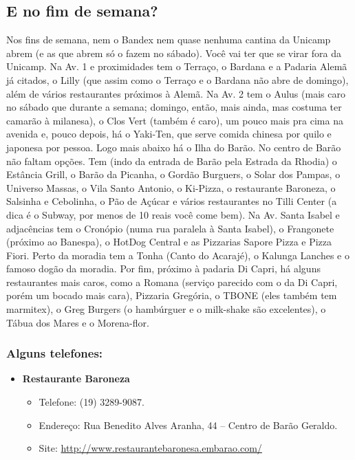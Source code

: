 \subsection{E no fim de semana?}
Nos fins de semana, nem o Bandex nem quase nenhuma cantina da Unicamp abrem (e
as que abrem só o fazem no sábado). Você vai ter que se virar fora da Unicamp.
Na Av. 1 e proximidades tem o Terraço, o Bardana e a Padaria Alemã já citados,
o Lilly (que assim como o Terraço e o Bardana não abre de domingo), além de
vários restaurantes próximos à Alemã. Na Av. 2 tem o Aulus (mais caro no sábado
que durante a semana; domingo, então, mais ainda, mas costuma ter camarão
à milanesa), o Clos Vert (também é caro), um pouco mais pra cima na avenida e,
pouco depois, há o Yaki-Ten, que serve comida chinesa por quilo e japonesa por
pessoa. Logo mais abaixo há o Ilha do Barão. No centro de Barão não faltam
opções. Tem (indo da entrada de Barão pela Estrada da Rhodia) o Estância Grill,
o Barão da Picanha, o Gordão Burguers, o Solar dos Pampas, o Universo Massas,
o Vila Santo Antonio, o Ki-Pizza, o restaurante Baroneza, o Salsinha
e Cebolinha, o Pão de Açúcar e vários restaurantes no Tilli Center (a dica
é o Subway, por menos de 10 reais você come bem). Na Av. Santa Isabel
e adjacências tem o Cronópio (numa rua paralela à Santa Isabel), o Frangonete
(próximo ao Banespa), o HotDog Central e as Pizzarias Sapore Pizza e Pizza
Fiori. Perto da moradia tem a Tonha (Canto do Acarajé), o Kalunga Lanches
e o famoso dogão da moradia. Por fim, próximo à padaria Di Capri, há alguns
restaurantes mais caros, como a Romana (serviço parecido com o da Di Capri,
porém um bocado mais cara), Pizzaria Gregória, o TBONE (eles também tem
marmitex), o Greg Burgers (o hambúrguer e o milk-shake são excelentes), o Tábua
dos Mares e o Morena-flor. 

\subsubsection{Alguns telefones:}
\begin{itemize}
\item  \textbf{Restaurante Baroneza}
\begin{itemize}
\item  Telefone: (19) 3289-9087.
\item  Endereço: Rua Benedito Alves Aranha, 44 -- Centro de Barão Geraldo.
\item  Site: \url{http://www.restaurantebaronesa.embarao.com/}
\end{itemize}
\end{itemize}

